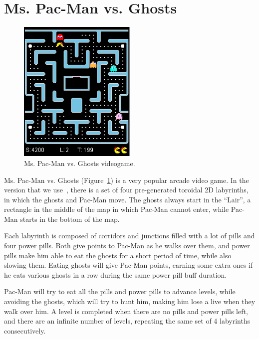 \documentclass{llncs}
\newcommand{\pacman}{Ms. Pac-Man vs. Ghosts }
\newcommand{\paco}{Pac-Man }
\begin{document}
%
\section{\pacman}
\label{sec:pacmanai}
%

\begin{figure}[tb]
	\centering
	\includegraphics[width=0.50\textwidth]{images/PacMan_ss.png}
	\caption{\pacman videogame.}
	\label{fig:pac-man}
\end{figure}

\pacman (Figure~\ref{fig:pac-man}) is a very popular arcade video game. In the version that we use~\cite{mspacmangithub}, there is a set of four pre-generated toroidal 2D labyrinths, in which the ghosts and \paco move. The ghosts always start in the ``Lair'', a rectangle in the middle of the map in which \paco cannot enter, while \paco starts in the bottom of the map. 

Each labyrinth is composed of corridors and junctions filled with a lot of pills and four power pills. Both give points to \paco as he walks over them, and power pills make him able to eat the ghosts for a short period of time, while also slowing them. Eating ghosts will give \paco points, earning some extra ones if he eats various ghosts in a row during the same power pill buff duration.

\paco will try to eat all the pills and power pills to advance levels, while avoiding the ghosts, which will try to hunt him, making him lose a live when they walk over him. A level is completed when there are no pills and power pills left, and there are an infinite number of levels, repeating the same set of 4 labyrinths consecutively.
\end{document}
